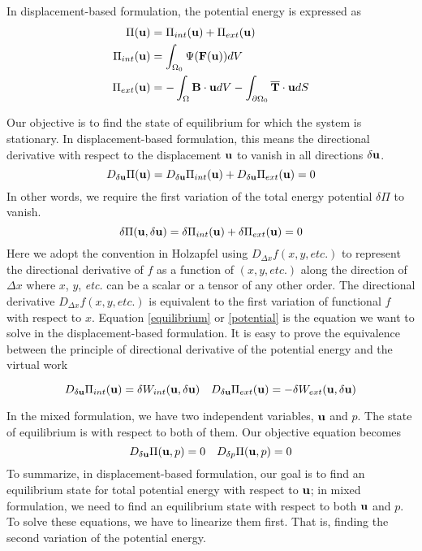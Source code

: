 In displacement-based formulation, the potential energy is expressed as
\begin{subequations}
\begin{align}
\Pi(\bold{u}) &= \Pi_{int}(\bold{u}) + \Pi_{ext}(\bold{u}) \\
\Pi_{int}(\bold{u}) &= \int_{\Omega_{0}}\Psi(\bold{F}(\bold{u}))dV  \label{pint} \\
\Pi_{ext}(\bold{u}) &=  - \int_\Omega\bold{B}\cdot\bold{u}dV -  \int_{\partial{\Omega_0}}\overline{\bold{T}}\cdot{\bold{u}}dS
\label{pext} 
\end{align}
\end{subequations}

Our objective is to find the state of equilibrium for which the system is stationary. In displacement-based formulation, this means the directional derivative with respect to the displacement $\bold{u}$ to vanish in all directions $\delta{\bold{u}}$.
\begin{equation} \label{equilibrium}
D_{\delta\bold{u}}\Pi(\bold{u}) = D_{\delta\bold{u}}\Pi_{int}(\bold{u}) + D_{\delta\bold{u}}\Pi_{ext}(\bold{u}) = 0
\end{equation} 
In other words, we require the first variation of the total energy potential $\delta\Pi$ to vanish.
\begin{equation} \label{potential}
\delta\Pi(\bold{u}, \delta\bold{u}) =\delta\Pi_{int}(\bold{u}) + \delta\Pi_{ext}(\bold{u}) = 0
\end{equation}
Here we adopt the convention in Holzapfel using $D_{\Delta{x}}f(x, y, \textit{etc.})$ to represent the directional derivative of $f$ as a function of $(x, y, \textit{etc.})$ along the direction of $\Delta{x}$ where $x$, $y$, \textit{etc.} can be a scalar or a tensor of any other order. The directional derivative $D_{\Delta{x}}f(x, y, \textit{etc.})$ is equivalent to the first variation of functional $f$ with respect to $x$.
Equation \ref{equilibrium} or \ref{potential} is the equation we want to solve in the displacement-based formulation. It is easy to prove the equivalence between the principle of directional derivative of the potential energy and the virtual work

\begin{equation}
D_{\delta\bold{u}}\Pi_{int}(\bold{u}) = \delta W_{int}(\bold{u}, \delta\bold{u}) \quad
D_{\delta\bold{u}}\Pi_{ext}(\bold{u}) = - \delta W_{ext}(\bold{u}, \delta\bold{u})
\end{equation}

In the mixed formulation, we have two independent variables, $\bold{u}$ and $p$. The state of equilibrium is with respect to both of them. Our objective equation becomes
\begin{equation} \label{target}
D_{\delta\bold{u}}\Pi(\bold{u}, p) = 0 \quad D_{\delta{p}}\Pi(\bold{u}, p) = 0
\end{equation}
To summarize, in displacement-based formulation, our goal is to find an equilibrium state for total potential energy with respect to $\bold{u}$; in mixed formulation, we need to find an equilibrium state with respect to both $\bold{u}$ and $p$. To solve these equations, we have to linearize them first. That is, finding the second variation of the potential energy.


